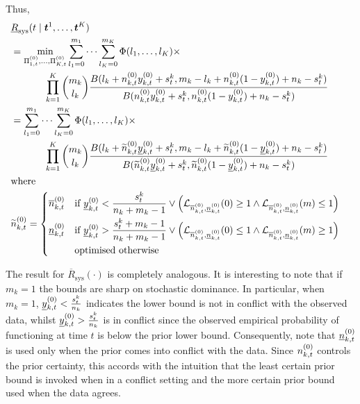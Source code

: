 \documentclass[12pt, a4paper]{elsarticle}
\newcommand{\bs}[1]{\boldsymbol{#1}}
\renewcommand{\vec}[1]{{\bs#1}}
\newcommand{\ul}[1]{\underline{#1}}
\newcommand{\ol}[1]{\overline{#1}}
\newcommand{\lRsys}{\ul{R}_\text{sys}}
\newcommand{\uRsys}{\ol{R}_\text{sys}}
\begin{document}
Thus,
\begin{align}
\lefteqn{\lRsys(t \mid \vec{t}^1, \ldots, \vec{t}^K)} \nonumber \\
 &= \min_{\PtZi{1}, \ldots, \PtZi{K}} 
    \sum_{l_1=0}^{m_1} \cdots \sum_{l_K=0}^{m_K} \Phi(l_1, \ldots, l_K) \times \nonumber \\ & \hspace*{8ex}
    \prod_{k=1}^K {m_k \choose l_k} \frac{B(l_k + \nktz\yktz + s^k_t, m_k - l_k + \nktz(1-\yktz) + n_k - s^k_t)}{B(\nktz\yktz + s^k_t, \nktz(1-\yktz) + n_k - s^k_t)}
    \nonumber\\
 &= \sum_{l_1=0}^{m_1} \cdots \sum_{l_K=0}^{m_K} \Phi(l_1, \ldots, l_K) \times \nonumber \\ & \hspace*{8ex}
    \prod_{k=1}^K {m_k \choose l_k} \frac{B(l_k + \nktzo\yktzl + s^k_t, m_k - l_k + \nktzo(1-\yktzl) + n_k - s^k_t)}{B(\nktzo\yktzl + s^k_t, \nktzo(1-\yktzl) + n_k - s^k_t)} \label{eq:LwrSysPost}\\
 &\mathrm{where} \nonumber \\
 &\nktzo = \left\{ \begin{aligned}
   \nktzu & \quad\mbox{if}\ \yktzl < \frac{s^k_t}{n_k + m_k - 1} \vee \Big( \mathcal{L}_{\nktzu,\nktzl}(0) \ge 1 \wedge \mathcal{L}_{\nktzu,\nktzl}(m) \le 1 \Big) \\
   \nktzl & \quad\mbox{if}\ \yktzl > \frac{s^k_t + m_k - 1}{n_k + m_k - 1} \vee \Big( \mathcal{L}_{\nktzu,\nktzl}(0) \le 1 \wedge \mathcal{L}_{\nktzu,\nktzl}(m) \ge 1 \Big) \\
   & \quad\mbox{optimised otherwise}
 \end{aligned} \right. \nonumber
\end{align}

The result for $\uRsys(\cdot)$ is completely analogous.  It is interesting
to note that if $m_k=1$ the bounds are sharp on stochastic dominance.
In particular, when $m_k=1$, $\yktzl < \frac{s^k_t}{n_k}$ indicates the 
lower bound is not in conflict with the observed data, whilst
$\yktzl > \frac{s^k_t}{n_k}$ is in conflict since the observed
empirical probability of functioning at time $t$ is below the
prior lower bound.  Consequently, note that $\nktzl$ is 
used only when the prior comes into conflict with the data.
Since $n^{(0)}_{k,t}$ controls the prior certainty, this accords with
the intuition that the least certain prior bound is invoked
when in a conflict setting and the more certain prior bound used when the data agrees.
\end{document}
